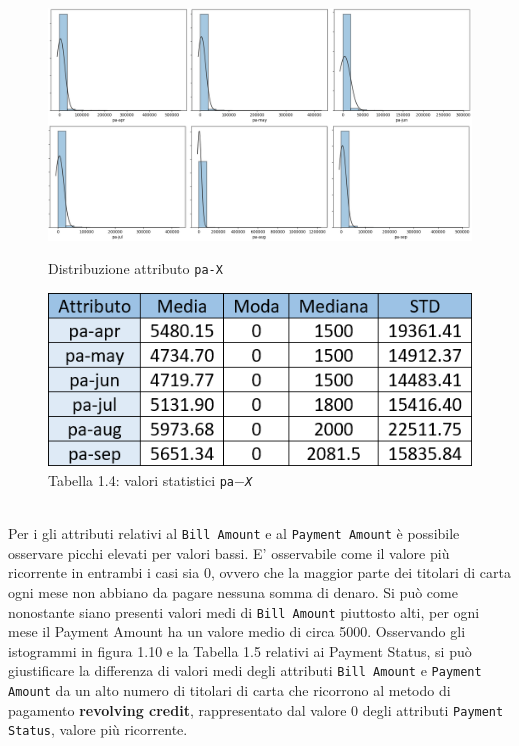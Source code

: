 \begin{figure}[!htb]
  \includegraphics[width=\linewidth]{img/pa-distribution.png}
  \caption{Distribuzione attributo \texttt{pa-X}}\label{pa-dist}
\endminipage\hfill
{}
  \includegraphics[width=\linewidth]{img/pa-stat.png}
\captionsetup{labelformat=empty}
\caption{Tabella 1.4: valori statistici \texttt{pa$-$\textit{X}}}
\label{pa-stat}
\endminipage\hfill
\end{figure}
\mbox{}\\
Per i gli attributi relativi al \texttt{Bill Amount} e al \texttt{Payment Amount} è possibile osservare picchi elevati per valori bassi. E' osservabile come il valore più ricorrente in entrambi i casi sia 0, ovvero che la maggior parte dei titolari di carta ogni mese non abbiano da pagare nessuna somma di denaro. Si può come nonostante siano presenti valori medi di \texttt{Bill Amount} piuttosto alti, per ogni mese il Payment Amount ha un valore medio di circa 5000. Osservando gli istogrammi in figura 1.10 e la Tabella 1.5 relativi ai Payment Status, si può giustificare la differenza di valori medi degli attributi \texttt{Bill Amount} e \texttt{Payment Amount} da un alto numero di titolari di carta che ricorrono al metodo di pagamento \textbf{revolving credit}, rappresentato dal valore 0 degli attributi \texttt{Payment Status}, valore più ricorrente.
